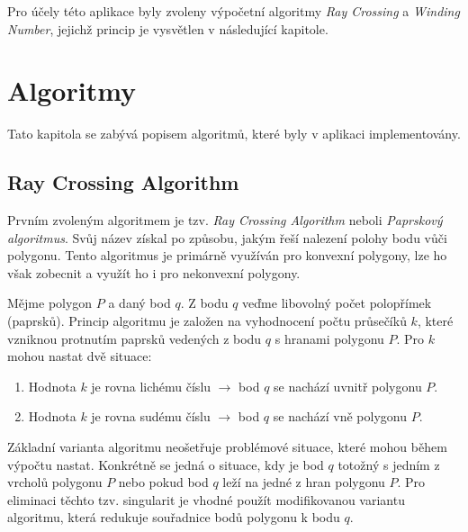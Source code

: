 \documentclass[a4paper, 12pt]{article}
\begin{document}
Pro účely této aplikace byly zvoleny výpočetní algoritmy \textit{Ray Crossing} a \textit{Winding Number}, jejichž princip je vysvětlen v následující kapitole.

\section{Algoritmy}
Tato kapitola se zabývá popisem algoritmů, které byly v aplikaci implementovány. 

\subsection{Ray Crossing Algorithm}
Prvním zvoleným algoritmem je tzv. \textit{Ray Crossing Algorithm} neboli \textit{Paprskový algoritmus}. Svůj název získal po způsobu, jakým řeší nalezení polohy bodu vůči polygonu. Tento algoritmus je primárně využíván pro konvexní polygony, lze ho však zobecnit a využít ho i pro nekonvexní polygony. 

Mějme polygon $P$ a daný bod $q$. Z bodu $q$ veďme libovolný počet polopřímek (paprsků). Princip algoritmu je založen na vyhodnocení počtu průsečíků $k$, které vzniknou protnutím paprsků vedených z bodu $q$ s hranami polygonu $P$. Pro $k$ mohou nastat dvě situace:
\begin{enumerate}
\item Hodnota $k$ je rovna lichému číslu $\rightarrow$ bod $q$ se nachází uvnitř polygonu $P$.
\item Hodnota $k$ je rovna sudému číslu $\rightarrow$ bod $q$ se nachází vně polygonu $P$.
\end{enumerate}

Základní varianta algoritmu neošetřuje problémové situace, které mohou během výpočtu nastat. Konkrétně se jedná o situace, kdy je bod $q$ totožný s jedním z vrcholů polygonu $P$ nebo pokud bod $q$ leží na jedné z hran polygonu $P$. Pro eliminaci těchto tzv. singularit je vhodné použít modifikovanou variantu algoritmu, která redukuje souřadnice bodů polygonu k bodu $q$. 
\end{document}
